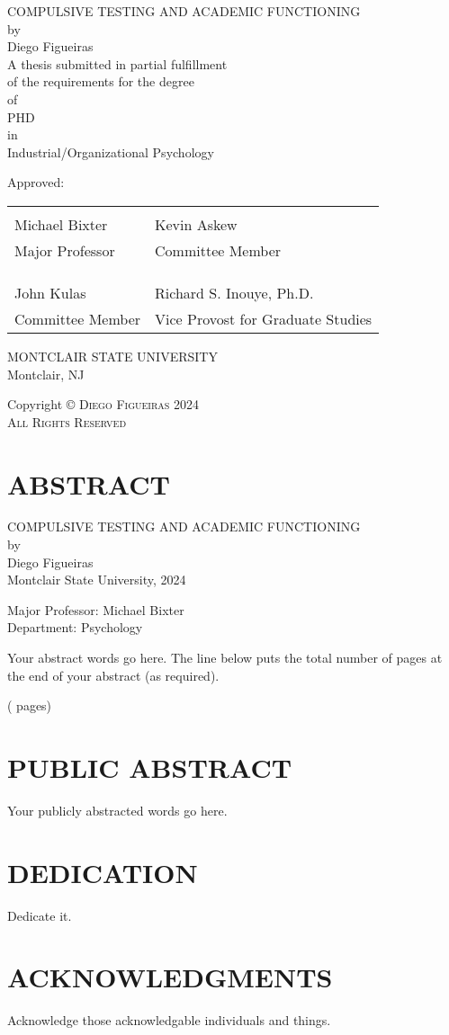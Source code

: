 \documentclass{DissertateUSU}
\renewcommand{\maketitle}{
	\thispagestyle{empty}
	\vspace*{\fill}
	\begin{center}
	\doublespaced
	\MakeUppercase{COMPULSIVE TESTING AND ACADEMIC FUNCTIONING}\\
	by\\
	Diego Figueiras \\
	\singlespaced
	A thesis submitted in partial fulfillment\\
	of the requirements for the degree \\
	\doublespaced
	of\\
	\MakeUppercase{PhD} \\
	in\\
	\singlespaced
  Industrial/Organizational Psychology \\
	\end{center}

	\vspace{20pt}
	\noindent Approved: \\
	\vspace{30pt}
	\noindent
	\begin{tabular}{ll}
    \makebox[2.75in]{\hrulefill} & \makebox[2.75in]{\hrulefill}\\
    Michael Bixter                      & Kevin Askew \\
    Major Professor              & Committee Member \\
    & \\
    & \\
    \makebox[2.75in]{\hrulefill} & \makebox[2.75in]{\hrulefill}\\
    John Kulas                 & Richard S. Inouye, Ph.D. \\
    Committee Member             & Vice Provost for Graduate Studies \\

    \end{tabular}

  \vspace{20pt}
    \begin{center}
	  \singlespacing
      \MakeUppercase{Montclair State University}\\
	    Montclair, NJ\\
	    \doublespacing
	    2024
	  \end{center}
	\vspace*{\fill}
	\clearpage
}
\newcommand{\abstracttitle}{

  \doublespacing
  \begin{center}
  COMPULSIVE TESTING AND ACADEMIC FUNCTIONING \\
  \vspace{12pt}
  by \\
  \vspace{12pt}
  Diego Figueiras \\
  Montclair State University, 2024
  \end{center}

  \vspace{12pt}

  \singlespacing
  \noindent Major Professor: Michael Bixter \\
  \noindent Department: Psychology

  \vspace{12pt}
}
\newcommand{\copyrightpage}{
	\vspace*{\fill}
  \begin{center}
	\doublespacing
	Copyright \hspace{3pt}
	  \scshape \small \copyright  \hspace{3pt}
	  Diego Figueiras \hspace{3pt} 2024 \\
	All Rights Reserved
  \end{center}
	\vspace*{\fill}
}
\begin{document}
\maketitle

\pagestyle{empty}
\copyrightpage

\newpage

\pagestyle{plain} \fancyhead[R]{\thepage} \fancyfoot[C]{}

\chapter*{ABSTRACT}

\abstracttitle
\doublespacing

Your abstract words go here. The line below puts the total number of
pages at the end of your abstract (as required).

\begin{flushright}(\pageref{LastPage} pages)\end{flushright}

\newpage
\fancyhead[R]{\thepage}
\fancyfoot[C]{}
\chapter*{PUBLIC ABSTRACT}
\doublespacing

Your publicly abstracted words go here.

\newpage
\fancyhead[R]{\thepage}
\fancyfoot[C]{}
\chapter*{DEDICATION}

Dedicate it.

\newpage
\fancyhead[R]{\thepage}
\fancyfoot[C]{}
\chapter*{ACKNOWLEDGMENTS}

Acknowledge those acknowledgable individuals and things.

\newpage
\fancyhead[R]{\thepage}
\fancyfoot[C]{}
\tableofcontents

\newpage
\fancyhead[R]{\thepage}
\fancyfoot[C]{}
\listoftables
\end{document}
